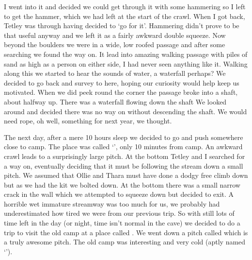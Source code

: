 
I went into it and decided we could get through it with some hammering so I left to get the hammer, which we had left at the start of the crawl. When I got back, Tetley was through having decided to ‘go for it’. Hammering didn’t prove to be that useful anyway and we left it as a fairly awkward double squeeze. Now beyond the boulders we were in a wide, low roofed passage and after some searching we found the way on. It lead into amazing walking passage with piles of sand as high as a person on either side, I had never seen anything like it. Walking along this we started to hear the sounds of water, a waterfall perhaps? We decided to go back and survey to here, hoping our curiosity would help keep us motivated. When we did peek round the corner the passage broke into a shaft, about halfway up. There was a waterfall flowing down the shaft We looked around and decided there was no way on without descending the shaft. We would need rope, oh well, something for next year, we thought.


The next day, after a mere 10 hours sleep we decided to go and push somewhere close to camp. The place was called ‘’, only 10 minutes from camp. An awkward crawl leads to a surprisingly large pitch. At the bottom Tetley and I searched for a way on, eventually deciding that it must be following the stream down a small pitch. We assumed that Ollie and Thara must have done a dodgy free climb down but as we had the kit we bolted down. At the bottom there was a small narrow crack in the wall which we attempted to squeeze down but decided to exit. A horrible wet immature streamway was too much for us, we probably had underestimated how tired we were from our previous trip. So with still lots of time left in the day (or night, time isn’t normal in the cave) we decided to do a trip to visit the old camp at a place called . We went down a pitch called  which is a truly awesome pitch. The old camp was interesting and very cold (aptly named ‘’).

